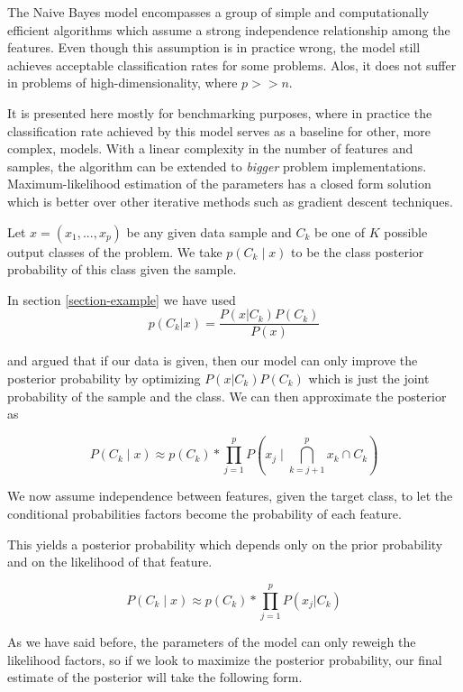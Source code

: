 \documentclass{article}%
\theoremstyle{definition}
\begin{document}
The Naive Bayes model encompasses a group of simple and computationally efficient algorithms which assume a strong independence relationship among the features. Even though this assumption is in practice wrong, the model still achieves acceptable classification rates for some problems. Alos, it does not suffer in problems of high-dimensionality, where $p >> n$.  

It is presented here mostly for benchmarking purposes, where in practice the classification rate achieved by this model serves as a baseline for other, more complex, models. With a linear complexity in the number of features and samples, the algorithm can be extended to \textit{bigger} problem implementations. Maximum-likelihood estimation of the parameters has a closed form solution which is better over other iterative methods such as gradient descent techniques.

Let $x = (x_1,...,x_p)$ be any given data sample and $C_k$ be one of $K$ possible output classes of the problem. We take $p(C_k \mid x)$  to be the  class posterior probability of this class given the sample. 

In section \ref{section-example}
we have used 
\[
p(C_k| x) = \frac{P(x|C_k)P(C_k)}{P(x)}
\]\label{equation-posteriorProbabilties}

and argued that if our data is given, then our model can only improve the posterior probability by optimizing $P(x|C_k)P(C_k)$ which is just the joint probability of the sample and the class. We can then approximate the posterior as

\[
P(C_k \mid x) \approx p(C_k) * \prod_{j=1}^{p}    P(x_j \mid \bigcap_{k=j+1}^{p} x_k \cap C_k)
\]\label{equation-posteriorProbabilityDecomposition1}

We now assume independence between features, given the target class, to let the conditional probabilities factors become the probability of each feature. %

This yields a posterior probability which depends only on the prior probability and on the likelihood of that feature.

\[
P(C_k \mid x) \approx p(C_k) * \prod_{j=1}^{p}    P(x_j | C_k)
\]\label{equation-posteriorProbabilityDecomposition2}

As we have said before, the parameters of the model can only reweigh the likelihood factors, so if we look to maximize the posterior probability, our final estimate of the posterior will take the following form.
\end{document}
